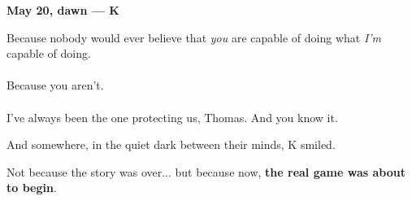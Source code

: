 \begin{JournalChat}
\vspace{1em}

\textbf{May 20, dawn — K}

\begin{adjustwidth}{2em}{}
    Because nobody would ever believe  
    that \textit{you} are capable of doing  
    what \textit{I’m} capable of doing.
    \\\\
    Because you aren’t.
    \\\\
    I’ve always been the one protecting us, Thomas.
    And you know it.
\end{adjustwidth}

\end{JournalChat}

\medskip

    And somewhere, in the quiet dark between their minds,  
    K smiled.
    
    Not because the story was over... but because now,  
    \textbf{the real game was about to begin}.

